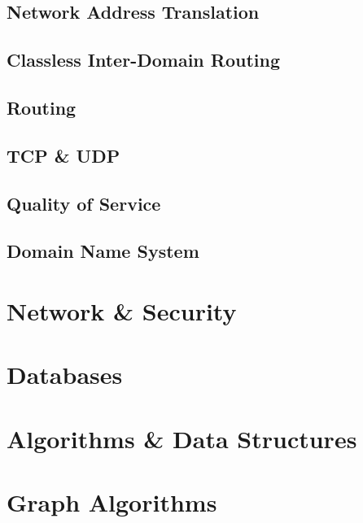 \documentclass[11pt,journal,compsoc]{IEEEtran}
\begin{document}
\subsection{Network Address Translation}

\begin{description}
    
\end{description}



\subsection{Classless Inter-Domain Routing}


\subsection{Routing}


\subsection{TCP \& UDP}


\subsection{Quality of Service}


\subsection{Domain Name System}




\section{Network \& Security}


\section{Databases}


\section{Algorithms \& Data Structures}


\section{Graph Algorithms}
\end{document}
